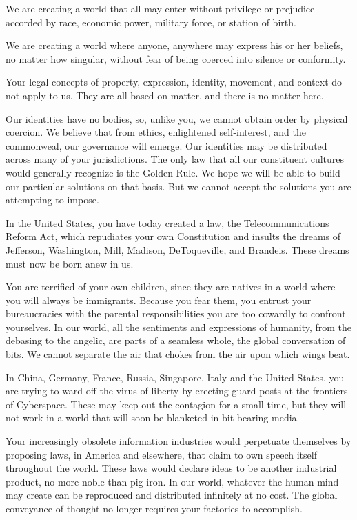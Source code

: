\documentclass[letterpaper,12pt,english]{sphinxmanual}
\begin{document}
We are creating a world that all may enter without privilege or prejudice accorded by race, economic power, military force, or station of birth.

We are creating a world where anyone, anywhere may express his or her beliefs, no matter how singular, without fear of being coerced into silence or conformity.

Your legal concepts of property, expression, identity, movement, and context do not apply to us. They are all based on matter, and there is no matter here.

Our identities have no bodies, so, unlike you, we cannot obtain order by physical coercion. We believe that from ethics, enlightened self-interest, and the commonweal, our governance will emerge. Our identities may be distributed across many of your jurisdictions. The only law that all our constituent cultures would generally recognize is the Golden Rule. We hope we will be able to build our particular solutions on that basis. But we cannot accept the solutions you are attempting to impose.

In the United States, you have today created a law, the Telecommunications Reform Act, which repudiates your own Constitution and insults the dreams of Jefferson, Washington, Mill, Madison, DeToqueville, and Brandeis. These dreams must now be born anew in us.

You are terrified of your own children, since they are natives in a world where you will always be immigrants. Because you fear them, you entrust your bureaucracies with the parental responsibilities you are too cowardly to confront yourselves. In our world, all the sentiments and expressions of humanity, from the debasing to the angelic, are parts of a seamless whole, the global conversation of bits. We cannot separate the air that chokes from the air upon which wings beat.

In China, Germany, France, Russia, Singapore, Italy and the United States, you are trying to ward off the virus of liberty by erecting guard posts at the frontiers of Cyberspace. These may keep out the contagion for a small time, but they will not work in a world that will soon be blanketed in bit-bearing media.

Your increasingly obsolete information industries would perpetuate themselves by proposing laws, in America and elsewhere, that claim to own speech itself throughout the world. These laws would declare ideas to be another industrial product, no more noble than pig iron. In our world, whatever the human mind may create can be reproduced and distributed infinitely at no cost. The global conveyance of thought no longer requires your factories to accomplish.
\end{document}
